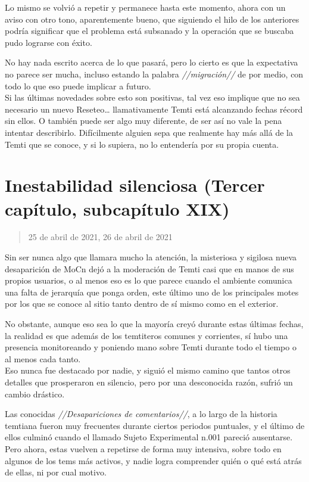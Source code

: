\documentclass[
  spanish,
]{book}
\begin{document}
Lo mismo se volvió a repetir y permanece hasta este momento, ahora con un aviso con otro tono, aparentemente bueno, que siguiendo el hilo de los anteriores podría significar que el problema está subsanado y la operación que se buscaba pudo lograrse con éxito.

No hay nada escrito acerca de lo que pasará, pero lo cierto es que la expectativa no parece ser mucha, incluso estando la palabra \emph{//migración//} de por medio, con todo lo que eso puede implicar a futuro.\\
Si las últimas novedades sobre esto son positivas, tal vez eso implique que no sea necesario un nuevo Reseteo\ldots{} llamativamente Temti está alcanzando fechas récord sin ellos. O también puede ser algo muy diferente, de ser así no vale la pena intentar describirlo. Difícilmente alguien sepa que realmente hay más allá de la Temti que se conoce, y si lo supiera, no lo entendería por su propia cuenta.

\hypertarget{inestabilidad-silenciosa-tercer-capuxedtulo-subcapuxedtulo-xix}{%
\section{Inestabilidad silenciosa (Tercer capítulo, subcapítulo XIX)}\label{inestabilidad-silenciosa-tercer-capuxedtulo-subcapuxedtulo-xix}}

\begin{quote}
25 de abril de 2021, 26 de abril de 2021
\end{quote}

Sin ser nunca algo que llamara mucho la atención, la misteriosa y sigilosa nueva desaparición de MoCn dejó a la moderación de Temti casi que en manos de sus propios usuarios, o al menos eso es lo que parece cuando el ambiente comunica una falta de jerarquía que ponga orden, este último uno de los principales motes por los que se conoce al sitio tanto dentro de sí mismo como en el exterior.

No obstante, aunque eso sea lo que la mayoría creyó durante estas últimas fechas, la realidad es que además de los temtiteros comunes y corrientes, sí hubo una presencia monitoreando y poniendo mano sobre Temti durante todo el tiempo o al menos cada tanto.\\
Eso nunca fue destacado por nadie, y siguió el mismo camino que tantos otros detalles que prosperaron en silencio, pero por una desconocida razón, sufrió un cambio drástico.

Las conocidas \emph{//Desapariciones de comentarios//}, a lo largo de la historia temtiana fueron muy frecuentes durante ciertos periodos puntuales, y el último de ellos culminó cuando el llamado Sujeto Experimental n.001 pareció ausentarse. Pero ahora, estas vuelven a repetirse de forma muy intensiva, sobre todo en algunos de los tems más activos, y nadie logra comprender quién o qué está atrás de ellas, ni por cual motivo.
\end{document}
